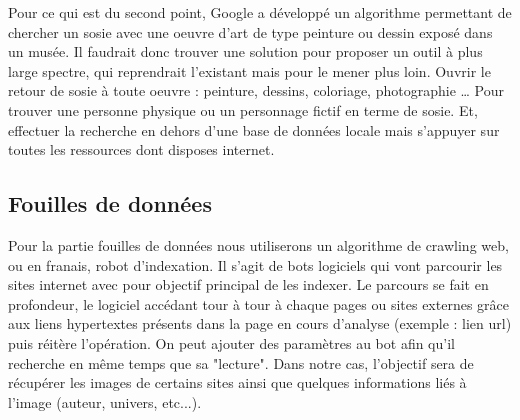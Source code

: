 \documentclass[a4paper,12pt]{article}
\begin{document}
Pour ce qui est du second point, Google a développé un algorithme permettant de chercher un sosie avec une oeuvre d’art de type peinture ou dessin exposé dans un musée. Il faudrait donc trouver une solution pour proposer un outil à plus large spectre, qui reprendrait l’existant mais pour le mener plus loin. 
Ouvrir le retour de sosie à toute oeuvre : peinture, dessins, coloriage, photographie … Pour trouver une personne physique ou un personnage fictif en terme de sosie. Et, effectuer la recherche en dehors d'une base de données locale mais s'appuyer sur toutes les ressources dont disposes internet. 

\subsection{Fouilles de données}
Pour la partie fouilles de données nous utiliserons un algorithme de crawling web, ou en franais, robot d'indexation.
Il s’agit de bots logiciels qui vont parcourir les sites internet avec
pour objectif principal de les indexer. Le parcours se fait en profondeur, le
logiciel accédant tour à tour à chaque pages ou sites externes grâce aux liens
hypertextes présents dans la page en cours d’analyse (exemple : lien url) puis
réitère l’opération. On peut ajouter des paramètres au bot afin qu’il recherche
en même temps que sa "lecture". Dans notre cas, l'objectif sera de récupérer les images de certains sites ainsi que quelques informations liés à l'image (auteur, univers, etc...).
\end{document}
